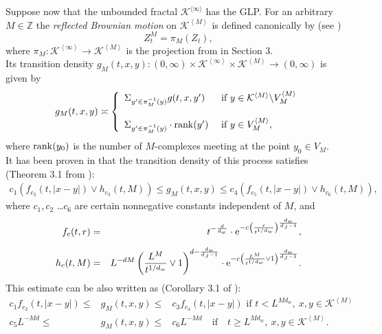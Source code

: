 \documentclass[11pt]{article}
\begin{document}
Suppose now that the unbounded fractal $\mathcal K^{\langle\infty\rangle}$ has the GLP. For an arbitrary $M\in\mathbb Z$ the \emph{reflected Brownian motion} on $\mathcal{K}^{\left\langle M\right\rangle}$ is defined canonically by (see \cite{bib:Kus2})
\begin{equation}\label{eq:process-def}
Z_t^M = \pi_M(Z_t),
\end{equation}
where $\pi_M: \mathcal{K}^{\left\langle \infty  \right\rangle} \to \mathcal{K}^{\left\langle M\right\rangle}$ is the projection from in Section 3.\\
Its transition density $g_M(t,x,y):(0,\infty)\times \mathcal{K}^{\left\langle \infty \right\rangle} \times \mathcal{K}^{\left\langle M \right\rangle} \rightarrow (0,\infty) $ is given by
\begin{equation}\label{eq:g_m_defi}
g_M(t,x,y) \asymp \left\{ \begin{array}{ll}
\Sigma_{y' \in \pi^{-1}_M(y)}g(t,x,y')  & \mbox{ if } y \in \mathcal{K}^{\left\langle M \right\rangle} \char`\\ V_M^{\left\langle M \right\rangle} \\
& \\
\Sigma_{y' \in \pi^{-1}_M(y)} \cdot {\rm rank}(y')  & \mbox{ if } y \in V_M^{\left\langle M \right\rangle},\\
\end{array} \right.
\end{equation}
where ${\rm rank}(y_0)$ is the number of $M$-complexes meeting at the point $y_0 \in V_M$.\\
It has been proven in \cite{Olszewski} that the transition density of this process satisfies (Theorem  3.1 from \cite{Olszewski}):
\begin{align}\label{eq:olsz:g_m}
c_1(f_{c_2}(t,|x-y|) \vee h_{c_3}(t,M)) \leq g_{M}(t,x,y) \leq c_4(f_{c_5}(t,|x-y|) \vee h_{c_6}(t,M)),
\end{align}
where $c_1,c_2$ \ldots $c_6$ are certain nonnegative constants independent of $M$, and
\begin{eqnarray*}
f_{c}(t,r) & = & t^{-\frac{d}{d_{w}}} \cdot {\rm e}^{-c\left(\frac{r}{t^{1/d_w}}\right)^\frac{d_w}{{d_{J}-1}}},\\[2mm]
h_{c}(t,M) & = & L^{-dM}\left(\frac{L^{M}}{t^{1/d_{w}}} \vee 1\right) ^{d-\frac{d_{w}}{d_{J}-1}} \cdot {\rm e}^{ -c\left( \frac{L^{M}}{t^{1/d_{w}}} \vee 1\right)^{\frac{d_w}{{d_{J}-1}}}}.
\end{eqnarray*}
This estimate can be also written as (Corollary 3.1 of \cite{Olszewski}):
\begin{eqnarray}\label{eq:corollary_3.1_olsz}
c_1f_{c_2}(t,|x-y|)  \leq & g_{M}(t,x,y) \leq & c_3 f_{c_4}(t,|x-y|) \mbox{ if } t<L^{Md_{w}}, \ x,y \in \mathcal{K}^{\left\langle M \right\rangle}\\[3mm]
c_5L^{-Md} \leq & g_{M}(t,x,y) \leq & c_6L^{-Md} \quad \mbox{if} \quad t \geq L^{Md_{w}}, \ x,y \in \mathcal{K}^{\left\langle M \right\rangle}. \nonumber
\end{eqnarray}
\end{document}
